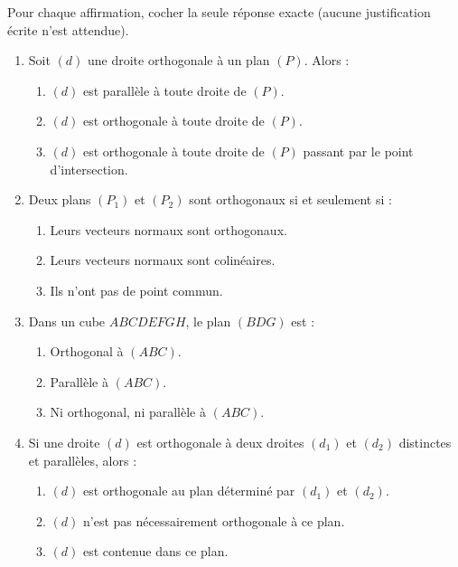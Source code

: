 \documentclass[11pt]{article}
\begin{document}
\begin{exercice}
Pour chaque affirmation, cocher la seule réponse exacte (aucune justification écrite n'est attendue).
\begin{enumerate}
    \item Soit $(d)$ une droite orthogonale à un plan $(P)$. Alors :
    \begin{enumerate}
        \item $(d)$ est parallèle à toute droite de $(P)$.
        \item $(d)$ est orthogonale à toute droite de $(P)$.
        \item $(d)$ est orthogonale à toute droite de $(P)$ passant par le point d'intersection.
    \end{enumerate}
    \item Deux plans $(P_1)$ et $(P_2)$ sont orthogonaux si et seulement si :
    \begin{enumerate}
        \item Leurs vecteurs normaux sont orthogonaux.
        \item Leurs vecteurs normaux sont colinéaires.
        \item Ils n'ont pas de point commun.
    \end{enumerate}
    \item Dans un cube $ABCDEFGH$, le plan $(BDG)$ est :
    \begin{enumerate}
        \item Orthogonal à $(ABC)$.
        \item Parallèle à $(ABC)$.
        \item Ni orthogonal, ni parallèle à $(ABC)$.
    \end{enumerate}
    \item Si une droite $(d)$ est orthogonale à deux droites $(d_1)$ et $(d_2)$ distinctes et parallèles, alors :
    \begin{enumerate}
        \item $(d)$ est orthogonale au plan déterminé par $(d_1)$ et $(d_2)$.
        \item $(d)$ n'est pas nécessairement orthogonale à ce plan.
        \item $(d)$ est contenue dans ce plan.
    \end{enumerate}
\end{enumerate}
\end{exercice}
\end{document}
